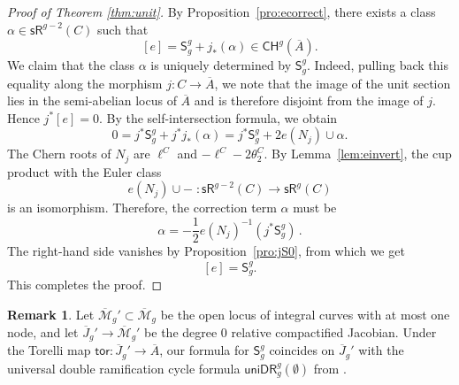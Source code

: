 \documentclass[11pt]{article}
\def\Mbar{\overline{\mathcal{M}}}
\def\CH{\mathsf{CH}}
\def\sR{\mathsf{sR}}
\def\Jbar{\overline{J}}
\def\uniDR{\mathsf{uniDR}}
\newcommand{\barA}{\overline{A}}
\newcommand{\sfS}{\mathsf{S}}
\theoremstyle{definition}
\newtheorem{remark}[definition]{Remark}
\begin{document}
\begin{proof}[Proof of Theorem \ref{thm:unit}]
    By Proposition~\ref{pro:ecorrect}, there exists a class $\alpha \in \sR^{g-2}(C)$ such that
    \[
    [e] = \sfS^g_g + j_*(\alpha) \in \CH^g(\barA).
    \]
    We claim that the class $\alpha$ is uniquely determined by $\sfS^g_g$. Indeed, pulling back this equality along the morphism $j \colon C \to \barA$, we note that the image of the unit section lies in the semi-abelian locus of $\barA$ and is therefore disjoint from the image of $j$. Hence $j^*[e] = 0$. By the self-intersection formula, we obtain
    \[
    0 = j^*\sfS^g_g + j^*j_*(\alpha)
  = j^*\sfS^g_g + 2e(N_j) \cup \alpha.
    \]
    The Chern roots of $N_j$ are $\ell^C$ and $-\ell^C - 2\theta_2^C$. By Lemma~\ref{lem:einvert}, the cup product with the Euler class
    \[
    e(N_j) \cup - \; : \sR^{g-2}(C) \longrightarrow \sR^{g}(C)
    \]
    is an isomorphism. Therefore, the correction term $\alpha$ must be
    \[
    \alpha = -\frac{1}{2} e(N_j)^{-1}(j^*\sfS^g_g)\,.
    \]
    The right-hand side vanishes by Proposition~\ref{pro:jS0}, from which we get
	$$[e]=\sfS^{g}_g.$$
    This completes the proof.
\end{proof}

\begin{remark}
    Let $\Mbar_g' \subset \Mbar_g$ be the open locus of integral curves with at most one node, and let $\Jbar_g' \to \Mbar_g'$ be the degree $0$ relative compactified Jacobian. Under the Torelli map $\mathsf{tor} : \Jbar_g' \to \barA$, our formula for $\sfS_g^g$ coincides on $\Jbar_g'$ with the universal double ramification cycle formula $\uniDR_g^g(\emptyset)$ from \cite{BHPSS}.
\end{remark}
\end{document}
